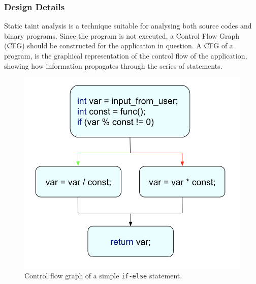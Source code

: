 \documentclass[LaM,binding=0.6cm]{sapthesis}
\begin{document}
\subsubsection{Design Details}
Static taint analysis is a technique suitable for analysing both source codes and binary programs. Since the program is not executed, a Control Flow Graph (CFG) should be constructed for the application in question\cite{mumtaz2017critical}. A CFG of a program, is the graphical representation of the control flow of the application, showing how information propagates through the series of statements\cite{WhyProgr19:online}.

\begin{figure}[h!]
\centering
\includegraphics[scale=.5]{images/techn1}
\caption{Control flow graph of a simple \texttt{if-else} statement.}
\end{figure}
\end{document}
